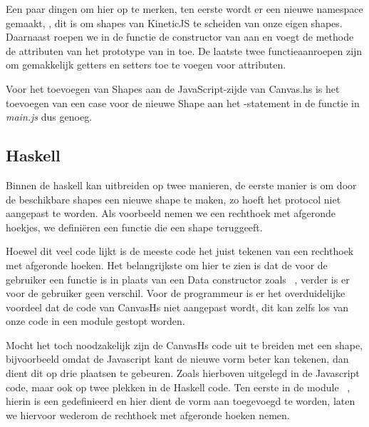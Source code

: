 Een paar dingen om hier op te merken, ten eerste wordt er een nieuwe namespace gemaakt, , dit is om shapes van KineticJS te scheiden van onze eigen shapes. Daarnaast roepen we in de  functie de constructor van  aan en voegt de  methode de attributen van het prototype van  in  toe. De laatste twee functieaanroepen zijn om gemakkelijk getters en setters toe te voegen voor attributen.

Voor het toevoegen van Shapes aan de JavaScript-zijde van Canvas.hs is het toevoegen van een case voor de nieuwe Shape aan het -statement in de  functie in \emph{main.js} dus genoeg.

\subsection{Haskell}

Binnen de haskell kan uitbreiden op twee manieren, de eerste manier is om door de beschikbare shapes een nieuwe shape te maken, zo hoeft het protocol niet aangepast te worden. Als voorbeeld nemen we een rechthoek met afgeronde hoekjes, we defini\"eren een functie  die een shape teruggeeft.



Hoewel dit veel code lijkt is de meeste code het juist tekenen van een rechthoek met afgeronde hoeken. Het belangrijkste om hier te zien is dat de  voor de gebruiker een functie is in plaats van een Data constructor zoals ~, verder is er voor de gebruiker geen verschil. Voor de programmeur is er het overduidelijke voordeel dat de code van CanvasHs niet aangepast wordt, dit kan zelfs los van onze code in een module gestopt worden.

Mocht het toch noodzakelijk zijn de CanvasHs code uit te breiden met een shape, bijvoorbeeld omdat de Javascript kant de nieuwe vorm beter kan tekenen, dan dient dit op drie plaatsen te gebeuren. Zoals hierboven uitgelegd in de Javascript code, maar ook op twee plekken in de Haskell code. Ten eerste in de module ~, hierin is een  gedefinieerd en hier dient de vorm aan toegevoegd te worden, laten we hiervoor wederom de rechthoek met afgeronde hoeken nemen.

